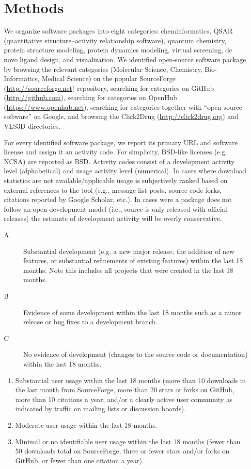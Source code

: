 \section{Methods}

We organize software packages into eight categories: cheminformatics, QSAR (quantitative structure–activity relationship software), quantum chemistry, protein structure modeling, protein dynamics modeling, virtual screening, de novo ligand design, and visualization.
We identified open-source software package by browsing the relevant categories (Molecular Science, Chemistry, Bio-Informatics, Medical Science) on the popular SourceForge (\url{http://sourceforge.net}) repository, searching for categories on GitHub (\url{http://github.com}), searching for categories on OpenHub (\url{https://www.openhub.net}), searching for categories together with ``open-source software'' on Google, and browsing the Click2Drug (\url{http://click2drug.org}) and VLS3D \cite{Villoutreix_2013} directories.

For every identified software package, we report its primary URL and software license and assign it an activity code. For simplicity, BSD-like licenses (e.g. NCSA) are reported as BSD. Activity codes consist of a development activity level (alphabetical) and usage activity level (numerical). In cases where download statistics are not available/applicable usage is subjectively ranked based on external references to the tool (e.g., message list posts, source code forks, citations reported by Google Scholar, etc.).  In cases were a package does not follow an open development model (i.e., source is only released with official releases) the estimate of development activity will be overly conservative.

\begin{description}
  \item[A] Substantial development (e.g. a new major release, the addition of new features, or substantial refinements of existing features) within the last 18 months. Note this includes all projects that were created in the last 18 months.
  \item[B] Evidence of some development within the last 18 months such as a minor release or bug fixes to a development branch.
  \item[C] No evidence of development (changes to the source code or documentation) within the last 18 months. 
\end{description}
\begin{enumerate}
  \item Substantial user usage within the last 18 months (more than 10 downloads in the last month from SourceForge, more than 20 stars or forks on GitHub, more than 10 citations a year, and/or a clearly active user community as indicated by traffic on mailing lists or discussion boards).
  \item Moderate user usage within the last 18 months.
    \item Minimal or no identifiable user usage within the last 18 months (fewer than 50 downloads total on SourceForge, three or fewer stars and/or forks on GitHub, or fewer than one citation a year).
\end{enumerate}

